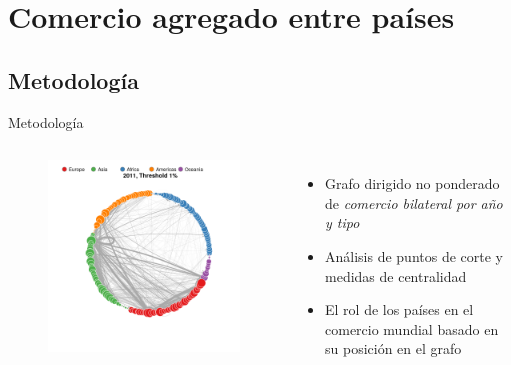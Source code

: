 \documentclass[compress]{beamer}
\begin{document}
\section{Comercio agregado entre países}

\subsection{Metodología}


\begin{frame}
\centering
\Large Metodología
\end{frame}



\begin{frame}
\begin{columns}[c] 

\begin{figure}
\includegraphics[width=1.4\linewidth]{grafo_Circ_2011_1_pcnt}
\end{figure}

\small

\begin{itemize}
	
	\item[\faRebel] Grafo dirigido no ponderado de \textit{comercio bilateral por año y tipo} 
	\item[\faRebel] Análisis de puntos de corte y medidas de centralidad
	\item[\faRebel] El rol de los países en el comercio mundial basado en su posición en el grafo	
\end{itemize}


\end{columns}
\end{frame}
\end{document}
